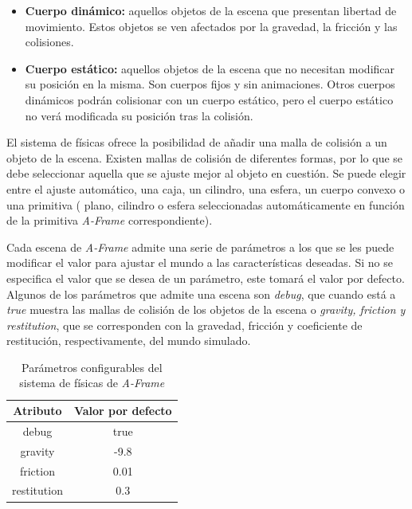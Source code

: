 \begin{itemize}
    \item \textbf{Cuerpo dinámico:} aquellos objetos de la escena que presentan libertad de movimiento. Estos objetos se ven afectados por la gravedad, la fricción y las colisiones.
    \item \textbf{Cuerpo estático:} aquellos objetos de la escena que no necesitan modificar su posición en la misma. Son cuerpos fijos y sin animaciones. Otros cuerpos dinámicos podrán colisionar con un cuerpo estático, pero el cuerpo estático no verá modificada su posición tras la colisión.
\end{itemize}

El sistema de físicas ofrece la posibilidad de añadir una malla de colisión a un objeto de la escena. Existen mallas de colisión de diferentes formas, por lo que se debe seleccionar aquella que se ajuste mejor al objeto en cuestión. Se puede elegir entre el ajuste automático, una caja, un cilindro, una esfera, un cuerpo convexo o una primitiva ( plano, cilindro o esfera seleccionadas automáticamente en función de la primitiva \textit{A-Frame} correspondiente). \newline


Cada escena de  \textit{A-Frame}  admite una serie de parámetros a los que se les puede modificar el valor para ajustar el mundo a las características deseadas. Si no se especifica el valor que se desea de un parámetro, este tomará el valor por defecto. Algunos de los parámetros que admite una escena son \textit{debug}, que cuando está a \textit{true} muestra las mallas de colisión de los objetos de la escena o \textit{gravity, friction y restitution}, que se corresponden con la gravedad, fricción y coeficiente de restitución, respectivamente, del mundo simulado.
\begin{table}[h!]
\centering
\begin{tabular}{|c|c|}
\hline
\textbf{Atributo}    & \textbf{Valor por defecto} \\ \hline
debug       & true              \\ \hline
gravity     & -9.8              \\ \hline
friction    & 0.01              \\ \hline
restitution & 0.3               \\ \hline
\end{tabular}
\caption{Parámetros configurables del sistema de físicas de \textit{A-Frame}}
\label{fig:param-fisicas}
\end{table}

